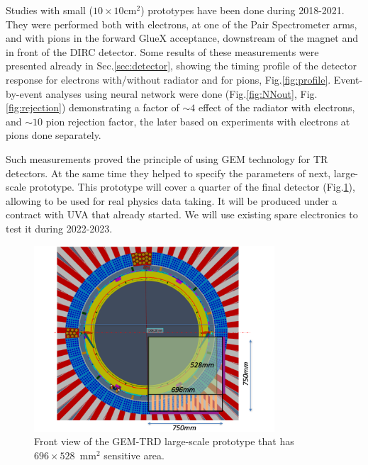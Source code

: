 \documentclass[%
preprint,
nofootinbib,
 amsmath,amssymb,
 aps,
floatfix,
]{revtex4-1}
\begin{document}
Studies with small ($10 \times 10$cm$^2$) prototypes have been done
during 2018-2021.
They were performed both with electrons, at one of the Pair Spectrometer arms,
and with pions in the forward GlueX acceptance, downstream of the magnet
and in front of the DIRC detector.
Some results of these measurements were presented already in Sec.\ref{sec:detector},
showing the timing profile of the detector response for electrons with/without radiator
and for pions, Fig.\ref{fig:profile}.
Event-by-event analyses using neural network were done 
(Fig.\ref{fig:NNout}, Fig.\ref{fig:rejection}) 
demonstrating a factor of $\sim 4$ effect of the radiator with electrons,
and $\sim 10$ pion rejection factor, the later based on experiments with
electrons at pions done separately.

Such measurements proved the principle of using GEM technology for TR detectors.
At the same time they helped to specify the parameters of next, large-scale prototype.
This prototype will cover a quarter of the final detector (Fig.\ref{fig:proto}),
allowing to be used for real physics data taking.
It will be produced under a contract with UVA that already started.
We will use existing spare electronics to test it during 2022-2023.
\begin{figure}[]
\includegraphics[width=0.80\textwidth]{./fig/GEM_TRD_prototype.pdf}
  \caption{
Front view of the GEM-TRD large-scale prototype
that has $696 \times 528$~mm$^2$ 
sensitive area. 
}
  \label{fig:proto}
\end{figure}
\end{document}
